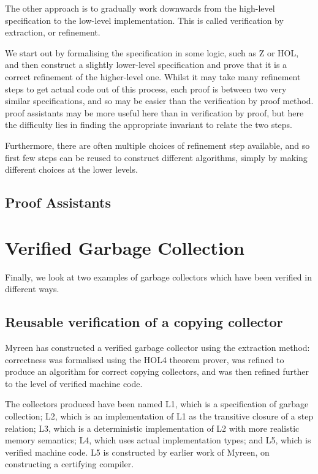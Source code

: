 The other approach is to gradually work downwards from the high-level
specification to the low-level implementation. This is called
\gls{verification by extraction}, or refinement.

We start out by formalising the specification in some logic, such as Z
or HOL, and then construct a slightly lower-level specification and
prove that it is a correct refinement of the higher-level one. Whilst
it may take many refinement steps to get actual code out of this
process, each proof is between two very similar \glspl{specification},
and so may be easier than the verification by proof
method. \Glspl{proof assistant} may be more useful here than in
verification by proof, but here the difficulty lies in finding the
appropriate invariant to relate the two steps.

Furthermore, there are often multiple choices of refinement step
available, and so first few steps can be reused to construct different
algorithms, simply by making different choices at the lower levels.

\subsection{Proof Assistants}


\section{Verified Garbage Collection}

Finally, we look at two examples of \glspl{garbage collector} which
have been verified in different ways.

\subsection{Reusable verification of a copying collector}

Myreen\cite{Myreen10} has constructed a verified \gls{garbage
  collector} using the extraction method: correctness was formalised
using the HOL4 theorem prover, was refined to produce an algorithm for
correct \gls{copying} \glspl{collector}, and was then refined further
to the level of verified machine code.

The \glspl{collector} produced have been named L1, which is a
specification of \gls{garbage collection}; L2, which is an
implementation of L1 as the transitive closure of a step relation; L3,
which is a deterministic implementation of L2 with more realistic
memory semantics; L4, which uses actual implementation types; and L5,
which is verified machine code. L5 is constructed by earlier work of
Myreen, on constructing a certifying compiler.

